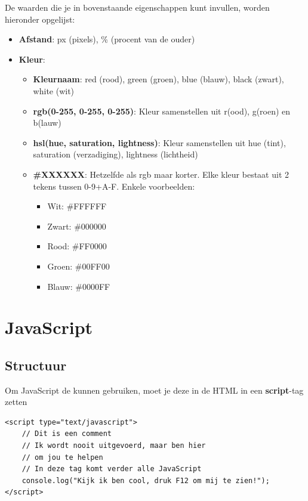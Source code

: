 De waarden die je in bovenstaande eigenschappen kunt invullen, worden hieronder
opgelijst:
\begin{itemize}
    \item \textbf{Afstand}: px (pixels), \% (procent van de ouder)
    \item \textbf{Kleur}: 
        \begin{itemize}
            \item \textbf{Kleurnaam}: red (rood), green (groen), blue (blauw),
                black (zwart), white (wit)
            \item \textbf{rgb(0-255, 0-255, 0-255)}: Kleur samenstellen uit
                r(ood), g(roen) en b(lauw)
            \item \textbf{hsl(hue, saturation, lightness)}: Kleur samenstellen uit
                hue (tint), saturation (verzadiging), lightness (lichtheid)
            \item \textbf{\#XXXXXX}: Hetzelfde als rgb maar korter. Elke kleur 
                bestaat uit 2 tekens tussen 0-9+A-F. Enkele voorbeelden:
                \begin{itemize}
                    \item Wit: \#FFFFFF
                    \item Zwart: \#000000
                    \item Rood: \#FF0000
                    \item Groen: \#00FF00
                    \item Blauw: \#0000FF
                \end{itemize}
        \end{itemize}
\end{itemize}

\section{JavaScript}%
\label{sec:javascript}

\subsection{Structuur}%
\label{sub:structuur}

Om JavaScript de kunnen gebruiken, moet je deze in de HTML in een
\textbf{script}-tag zetten
\begin{verbatim}
<script type="text/javascript">
    // Dit is een comment
    // Ik wordt nooit uitgevoerd, maar ben hier
    // om jou te helpen
    // In deze tag komt verder alle JavaScript
    console.log("Kijk ik ben cool, druk F12 om mij te zien!");
</script>
\end{verbatim}

